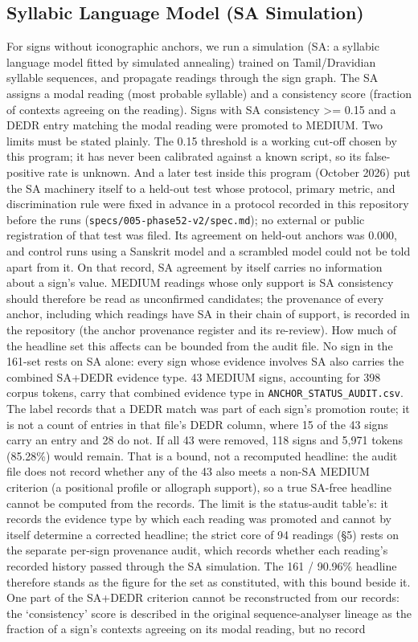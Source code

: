 \documentclass[11pt]{article}
\begin{document}
\subsection{Syllabic Language Model (SA
Simulation)}\label{syllabic-language-model-sa-simulation}

For signs without iconographic anchors, we run a simulation (SA: a syllabic language model fitted by simulated annealing) trained on Tamil/Dravidian syllable sequences, and propagate readings through the sign graph. The SA assigns a modal reading (most probable syllable) and a consistency score (fraction of contexts agreeing on the reading). Signs with SA consistency \textgreater{}= 0.15 and a DEDR entry matching the modal reading were promoted to MEDIUM. Two limits must be stated plainly. The 0.15 threshold is a working cut-off chosen by this program; it has never been calibrated against a known script, so its false-positive rate is unknown. And a later test inside this program (October 2026) put the SA machinery itself to a held-out test whose protocol, primary metric, and discrimination rule were fixed in advance in a protocol recorded in this repository before the runs (\texttt{specs/005-phase52-v2/spec.md}); no external or public registration of that test was filed. Its agreement on held-out anchors was 0.000, and control runs using a Sanskrit model and a scrambled model could not be told apart from it. On that record, SA agreement by itself carries no information about a sign's value. MEDIUM readings whose only support is SA consistency should therefore be read as unconfirmed candidates; the provenance of every anchor, including which readings have SA in their chain of support, is recorded in the repository (the anchor provenance register and its re-review). How much of the headline set this affects can be bounded from the audit file. No sign in the 161-set rests on SA alone: every sign whose evidence involves SA also carries the combined SA+DEDR evidence type. 43 MEDIUM signs, accounting for 398 corpus tokens, carry that combined evidence type in \texttt{ANCHOR\_STATUS\_AUDIT.csv}. The label records that a DEDR match was part of each sign's promotion route; it is not a count of entries in that file's DEDR column, where 15 of the 43 signs carry an entry and 28 do not. If all 43 were removed, 118 signs and 5,971 tokens (85.28\%) would remain. That is a bound, not a recomputed headline: the audit file does not record whether any of the 43 also meets a non-SA MEDIUM criterion (a positional profile or allograph support), so a true SA-free headline cannot be computed from the records. The limit is the status-audit table's: it records the evidence type by which each reading was promoted and cannot by itself determine a corrected headline; the strict core of 94 readings (§5) rests on the separate per-sign provenance audit, which records whether each reading's recorded history passed through the SA simulation. The 161 / 90.96\% headline therefore stands as the figure for the set as constituted, with this bound beside it. One part of the SA+DEDR criterion cannot be reconstructed from our records: the `consistency' score is described in the original sequence-analyser lineage as the fraction of a sign's contexts agreeing on its modal reading, but no record 
\end{document}
